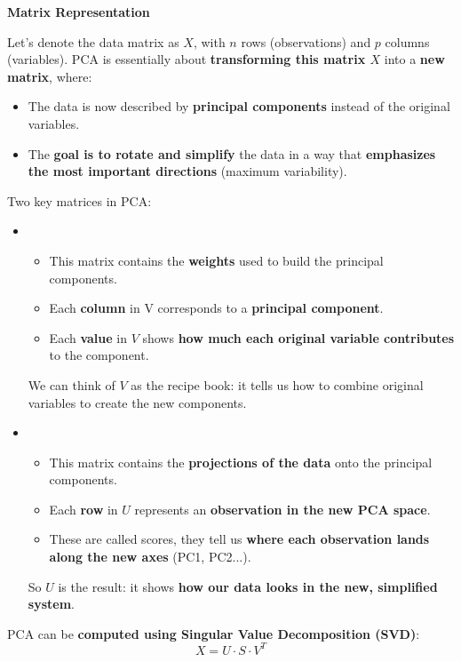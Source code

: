 \highspace
\begin{flushleft}
    \textcolor{Green3}{ \textbf{Matrix Representation}}
\end{flushleft}
Let's denote the data matrix as $X$, with $n$ rows (observations) and $p$ columns (variables). PCA is essentially about \textbf{transforming this matrix $X$} into a \textbf{new matrix}, where:
\begin{itemize}
    \item The data is now described by \textbf{principal components} instead of the original variables.
    \item The \textbf{goal is to rotate and simplify} the data in a way that \textbf{emphasizes the most important directions} (maximum variability).
\end{itemize}
Two key matrices in PCA:
\begin{itemize}
    \item {}
    \begin{itemize}
        \item This matrix contains the \textbf{weights} used to build the principal components.
        \item Each \textbf{column} in V corresponds to a \textbf{principal component}.
        \item Each \textbf{value} in $V$ shows \textbf{how much each original variable contributes} to the component.
    \end{itemize}
    We can think of $V$ as the recipe book: it tells us how to combine original variables to create the new components.

    \item {}
    \begin{itemize}
        \item This matrix contains the \textbf{projections of the data} onto the principal components.
        \item Each \textbf{row} in $U$ represents an \textbf{observation in the new PCA space}.
        \item These are called scores, they tell us \textbf{where each observation lands along the new axes} (PC1, PC2...).
    \end{itemize}
    So $U$ is the result: it shows \textbf{how our data looks in the new, simplified system}.
\end{itemize}
PCA can be \textbf{computed using Singular Value Decomposition (SVD)}:
\begin{equation}
    X = U \cdot S \cdot V^{T}
\end{equation}
